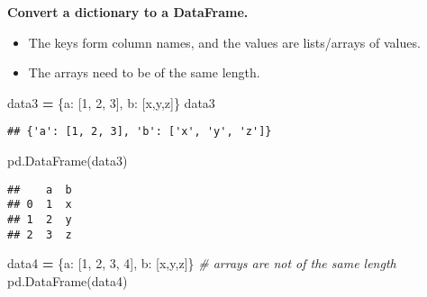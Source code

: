 \documentclass[
]{book}
\newenvironment{Shaded}{\begin{snugshade}}{\end{snugshade}}
\newcommand{\CommentTok}[1]{\textcolor[rgb]{0.56,0.35,0.01}{\textit{#1}}}
\newcommand{\DecValTok}[1]{\textcolor[rgb]{0.00,0.00,0.81}{#1}}
\newcommand{\NormalTok}[1]{#1}
\newcommand{\OperatorTok}[1]{\textcolor[rgb]{0.81,0.36,0.00}{\textbf{#1}}}
\newcommand{\StringTok}[1]{\textcolor[rgb]{0.31,0.60,0.02}{#1}}
\begin{document}
\textbf{Convert a dictionary to a DataFrame.}

\begin{itemize}
\item
  The keys form column names, and the values are lists/arrays of values.
\item
  The arrays need to be of the same length.
\end{itemize}

\begin{Shaded}
\begin{Highlighting}[]
\NormalTok{data3 }\OperatorTok{=}\NormalTok{ \{}\StringTok{\textquotesingle{}a\textquotesingle{}}\NormalTok{: [}\DecValTok{1}\NormalTok{, }\DecValTok{2}\NormalTok{, }\DecValTok{3}\NormalTok{], }\StringTok{\textquotesingle{}b\textquotesingle{}}\NormalTok{: [}\StringTok{\textquotesingle{}x\textquotesingle{}}\NormalTok{,}\StringTok{\textquotesingle{}y\textquotesingle{}}\NormalTok{,}\StringTok{\textquotesingle{}z\textquotesingle{}}\NormalTok{]\}}
\NormalTok{data3 }
\end{Highlighting}
\end{Shaded}

\begin{verbatim}
## {'a': [1, 2, 3], 'b': ['x', 'y', 'z']}
\end{verbatim}

\begin{Shaded}
\begin{Highlighting}[]
\NormalTok{pd.DataFrame(data3)}
\end{Highlighting}
\end{Shaded}

\begin{verbatim}
##    a  b
## 0  1  x
## 1  2  y
## 2  3  z
\end{verbatim}

\begin{Shaded}
\begin{Highlighting}[]
\NormalTok{data4 }\OperatorTok{=}\NormalTok{ \{}\StringTok{\textquotesingle{}a\textquotesingle{}}\NormalTok{: [}\DecValTok{1}\NormalTok{, }\DecValTok{2}\NormalTok{, }\DecValTok{3}\NormalTok{, }\DecValTok{4}\NormalTok{], }\StringTok{\textquotesingle{}b\textquotesingle{}}\NormalTok{: [}\StringTok{\textquotesingle{}x\textquotesingle{}}\NormalTok{,}\StringTok{\textquotesingle{}y\textquotesingle{}}\NormalTok{,}\StringTok{\textquotesingle{}z\textquotesingle{}}\NormalTok{]\} }\CommentTok{\# arrays are not of the same length}
\NormalTok{pd.DataFrame(data4)}
\end{Highlighting}
\end{Shaded}
\end{document}

